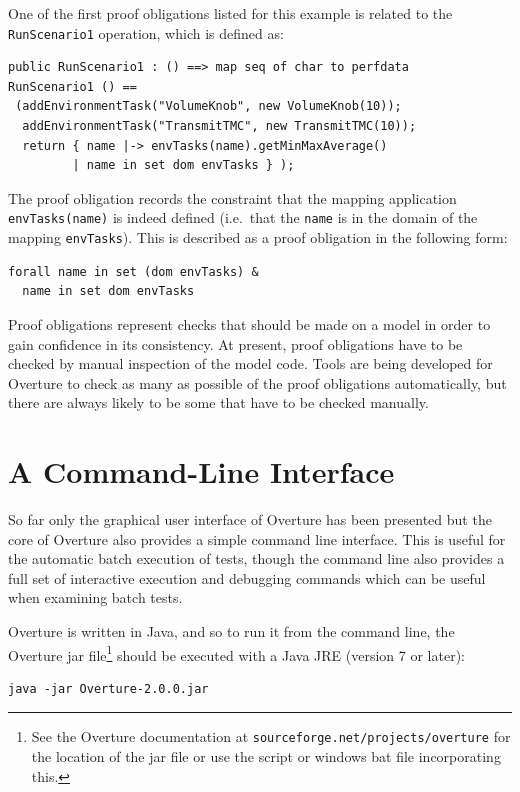 One of the first proof obligations listed for this example is related
to the \texttt{RunScenario1} operation, which is defined as:

\begin{lstlisting}
public RunScenario1 : () ==> map seq of char to perfdata
RunScenario1 () ==
 (addEnvironmentTask("VolumeKnob", new VolumeKnob(10));
  addEnvironmentTask("TransmitTMC", new TransmitTMC(10));
  return { name |-> envTasks(name).getMinMaxAverage() 
         | name in set dom envTasks } );
\end{lstlisting}

The proof obligation records the constraint that the mapping
application \texttt{envTasks(name)} is indeed defined (i.e.\ that the
\texttt{name} is in the domain of the mapping \texttt{envTasks}). This is described as a proof
obligation in the following form:

\begin{lstlisting}
forall name in set (dom envTasks) &
  name in set dom envTasks
\end{lstlisting}
Proof obligations represent checks that should be made on a model in
order to gain confidence in its consistency. At present, proof
obligations have to be checked by manual inspection of the model
code. Tools are being developed for Overture to check as many as
possible of the proof obligations automatically, but there are always
likely to be some that have to be checked manually. 


\section{A Command-Line Interface}\label{sec:cmdline}

So far only the graphical user interface of Overture has been
presented but the core of Overture also
provides a simple command line interface.  This is useful for the
automatic batch execution of tests, though the command line also
provides a full set of interactive execution and debugging commands
which can be useful when examining batch tests. 

Overture is written in Java, and so to run it from the command line, the
Overture jar file\footnote{See the Overture documentation at
  \texttt{sourceforge.net/projects/overture} for the location of the
  jar file or use the script or windows bat file incorporating this.}  
should be executed with a Java JRE (version 7 or later):

\lstset{style=tool,language=}
\begin{lstlisting}
java -jar Overture-2.0.0.jar
\end{lstlisting}


